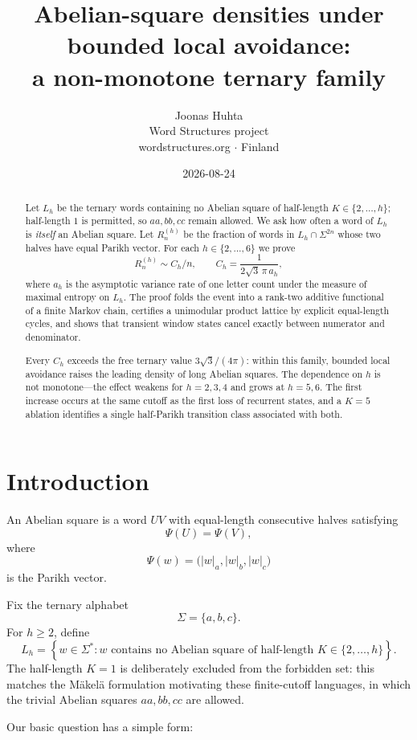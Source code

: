 \documentclass[12pt]{article}
\title{Abelian-square densities under bounded local avoidance:\\ a non-monotone ternary family}
\author{Joonas Huhta \\ Word Structures project \\ wordstructures.org $\cdot$ Finland}
\date{2026-08-24}
\theoremstyle{definition}
\begin{document}
\maketitle

\begin{abstract}
Let \(L_h\) be the ternary words containing no Abelian square of half-length \(K\in\{2,\ldots,h\}\); half-length \(1\) is permitted, so \(aa,bb,cc\) remain allowed. We ask how often a word of \(L_h\) is \emph{itself} an Abelian square. Let \(R_n^{(h)}\) be the fraction of words in \(L_h\cap\Sigma^{2n}\) whose two halves have equal Parikh vector. For each \(h\in\{2,\ldots,6\}\) we prove
\[
R_n^{(h)}\sim C_h/n,
\qquad
C_h=\frac{1}{2\sqrt3\,\pi\,a_h},
\]
where \(a_h\) is the asymptotic variance rate of one letter count under the measure of maximal entropy on \(L_h\). The proof folds the event into a rank-two additive functional of a finite Markov chain, certifies a unimodular product lattice by explicit equal-length cycles, and shows that transient window states cancel exactly between numerator and denominator.

Every \(C_h\) exceeds the free ternary value \(3\sqrt3/(4\pi)\): within this family, bounded local avoidance raises the leading density of long Abelian squares. The dependence on \(h\) is not monotone---the effect weakens for \(h=2,3,4\) and grows at \(h=5,6\). The first increase occurs at the same cutoff as the first loss of recurrent states, and a \(K=5\) ablation identifies a single half-Parikh transition class associated with both.
\end{abstract}

\section{Introduction}
\label{sec:intro}

An Abelian square is a word \(UV\) with equal-length consecutive halves satisfying
\[
\Psi(U)=\Psi(V),
\]
where
\[
\Psi(w)=\bigl(|w|_a,|w|_b,|w|_c\bigr)
\]
is the Parikh vector.

Fix the ternary alphabet
\[
\Sigma=\{a,b,c\}.
\]
For \(h\ge2\), define
\[
L_h
=
\left\{
w\in\Sigma^*:
w\text{ contains no Abelian square of half-length }K\in\{2,\ldots,h\}
\right\}.
\]
The half-length \(K=1\) is deliberately excluded from the forbidden set: this matches the M\"akel\"a formulation motivating these finite-cutoff languages, in which the trivial Abelian squares \(aa,bb,cc\) are allowed.

Our basic question has a simple form:
\end{document}
